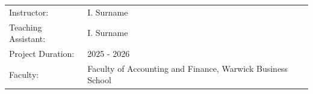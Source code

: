 \begin{titlepage}
\begin{center}
\bigskip
\bigskip

\begin{tabular}{ll}
    Instructor: & I. Surname \\
    Teaching Assistant: & I. Surname \\
    Project Duration: & 2025 - 2026 \\
    Faculty: & Faculty of Accounting and Finance, Warwick Business School
\end{tabular}

\bigskip
\bigskip
\vfill

\end{center}


\end{titlepage}
